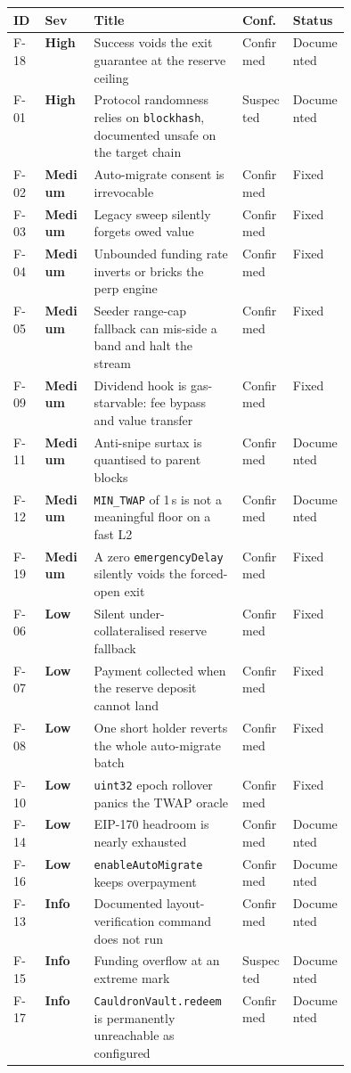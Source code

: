 \documentclass[11pt,a4paper]{article}
\newcommand{\SevHigh}{\textcolor{high}{\textbf{High}}}
\newcommand{\SevMed}{\textcolor{medium}{\textbf{Medium}}}
\newcommand{\SevLow}{\textcolor{low}{\textbf{Low}}}
\newcommand{\SevInfo}{\textcolor{info}{\textbf{Info}}}
\newcommand{\Conf}{\textcolor{critical}{Confirmed}}
\newcommand{\Susp}{\textcolor{medium}{Suspected}}
\newcommand{\code}[1]{\texttt{\small #1}}
\begin{document}
\begin{longtable}{@{}llp{0.44\linewidth}ll@{}}
\toprule
\textbf{ID} & \textbf{Sev} & \textbf{Title} & \textbf{Conf.} & \textbf{Status} \\
\midrule\endhead
F-18 & \SevHigh & Success voids the exit guarantee at the reserve ceiling & \Conf & Documented \\
F-01 & \SevHigh & Protocol randomness relies on \code{blockhash}, documented unsafe on the target chain & \Susp & Documented \\
F-02 & \SevMed & Auto-migrate consent is irrevocable & \Conf & \textcolor{good}{Fixed} \\
F-03 & \SevMed & Legacy sweep silently forgets owed value & \Conf & \textcolor{good}{Fixed} \\
F-04 & \SevMed & Unbounded funding rate inverts or bricks the perp engine & \Conf & \textcolor{good}{Fixed} \\
F-05 & \SevMed & Seeder range-cap fallback can mis-side a band and halt the stream & \Conf & \textcolor{good}{Fixed} \\
F-09 & \SevMed & Dividend hook is gas-starvable: fee bypass and value transfer & \Conf & \textcolor{good}{Fixed} \\
F-11 & \SevMed & Anti-snipe surtax is quantised to parent blocks & \Conf & Documented \\
F-12 & \SevMed & \code{MIN\_TWAP} of 1\,s is not a meaningful floor on a fast L2 & \Conf & Documented \\
F-19 & \SevMed & A zero \code{emergencyDelay} silently voids the forced-open exit & \Conf & \textcolor{good}{Fixed} \\
F-06 & \SevLow & Silent under-collateralised reserve fallback & \Conf & \textcolor{good}{Fixed} \\
F-07 & \SevLow & Payment collected when the reserve deposit cannot land & \Conf & \textcolor{good}{Fixed} \\
F-08 & \SevLow & One short holder reverts the whole auto-migrate batch & \Conf & \textcolor{good}{Fixed} \\
F-10 & \SevLow & \code{uint32} epoch rollover panics the TWAP oracle & \Conf & \textcolor{good}{Fixed} \\
F-14 & \SevLow & EIP-170 headroom is nearly exhausted & \Conf & Documented \\
F-16 & \SevLow & \code{enableAutoMigrate} keeps overpayment & \Conf & Documented \\
F-13 & \SevInfo & Documented layout-verification command does not run & \Conf & Documented \\
F-15 & \SevInfo & Funding overflow at an extreme mark & \Susp & Documented \\
F-17 & \SevInfo & \code{CauldronVault.redeem} is permanently unreachable as configured & \Conf & Documented \\
\bottomrule
\end{longtable}
\end{document}
